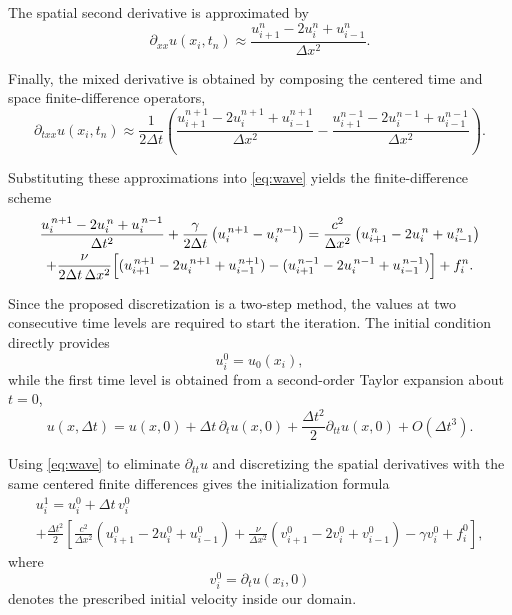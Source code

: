 \documentclass{Configuration_Files/PoliMi3i_thesis}
\begin{document}
The spatial second derivative is approximated by
\begin{equation*}
\partial_{xx}u(x_i,t_n)
\approx
\frac{u_{i+1}^n-2u_i^n+u_{i-1}^n}{\Delta x^2}.
\end{equation*}

Finally, the mixed derivative is obtained by composing the centered time and space finite-difference operators,
\begin{equation*}
\partial_{txx}u(x_i,t_n)
\approx
\frac{1}{2\Delta t}
\left(
\frac{u_{i+1}^{n+1}-2u_i^{n+1}+u_{i-1}^{n+1}}{\Delta x^2}
-
\frac{u_{i+1}^{n-1}-2u_i^{n-1}+u_{i-1}^{n-1}}{\Delta x^2}
\right).
\end{equation*}

Substituting these approximations into \eqref{eq:wave} yields the finite-difference scheme
\begin{multline}
    \frac{u_i^{\,n+1}-2u_i^{\,n}+u_i^{\,n-1}}{\Delta t^{2}}
    +\frac{\gamma}{2\Delta t}\left(u_i^{\,n+1}-u_i^{\,n-1}\right)
    =
    \frac{c^{2}}{\Delta x^{2}}
    \left(
    u_{i+1}^{\,n}-2u_i^{\,n}+u_{i-1}^{\,n}
    \right)
    \\
    +
    \frac{\nu}{2\Delta t\,\Delta x^{2}}
    \Bigl[
    (u_{i+1}^{\,n+1}-2u_i^{\,n+1}+u_{i-1}^{\,n+1})
    -
    (u_{i+1}^{\,n-1}-2u_i^{\,n-1}+u_{i-1}^{\,n-1})
    \Bigr]
    +f_i^n.
    \label{eq:fdtd_scalar}
\end{multline}

Since the proposed discretization is a two-step method, the values at two consecutive time levels are required to start the iteration. The initial condition directly provides
\begin{equation*}
u_i^0=u_0(x_i),
\end{equation*}
while the first time level is obtained from a second-order Taylor expansion about \(t=0\),
\begin{equation*}
u(x,\Delta t)
=
u(x,0)
+
\Delta t\,\partial_tu(x,0)
+
\frac{\Delta t^2}{2}\partial_{tt}u(x,0)
+
O(\Delta t^3).
\end{equation*}

Using \eqref{eq:wave} to eliminate \(\partial_{tt}u\) and discretizing the spatial derivatives with the same centered finite differences gives the initialization formula
\begin{multline}
u_i^1
=
u_i^0
+
\Delta t\,v_i^0
\\
+
\frac{\Delta t^2}{2}
\left[
\frac{c^2}{\Delta x^2}
\left(
u_{i+1}^0-2u_i^0+u_{i-1}^0
\right)
+
\frac{\nu}{\Delta x^2}
\left(
v_{i+1}^0-2v_i^0+v_{i-1}^0
\right)
-
\gamma v_i^0
+
f_i^0
\right],
\end{multline}
where
\[
v_i^0=\partial_tu(x_i,0)
\]
denotes the prescribed initial velocity inside our domain.
\end{document}
